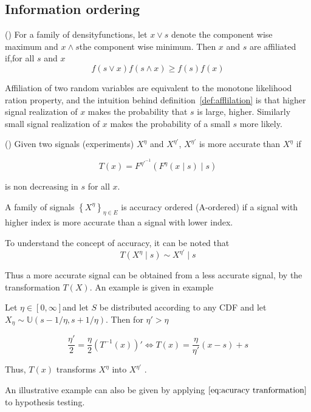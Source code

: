 \documentclass[10pt,a4paper]{article} %
\begin{document}

\subsection{Information ordering}

\begin{defn}
\label{def:afflilation} (\citet{Milgrom1982}) 
For a family of densityfunctions, let $x\lor s$ denote the component wise maximum and $x\land s$the component wise minimum. Then $x$ and $s$ are affiliated if,for all $s$ and $x$
\[
f(s\lor x)f(s\land x)\ge f(s)f(x)
\]
\end{defn}

Affiliation of two random variables are equivalent to the monotone likelihood ration property, and the intuition behind definition~\ref{def:afflilation} is that higher signal realization of $x$ makes the probability that $s$ is large, higher. Similarly small signal realization of $x$ makes the probability of a small $s$ more likely.

\begin{defn}\label{def:accuracy}
(\citet{Persico2000}) Given two signals
(experiments) $X^{\eta}$ and $X^{\eta'}$, $X^{\eta'}$ is more accurate than $X^{\eta}$ if

\begin{equation}
T(x)=F^{\eta'^{-1}}(F^{\eta}(x\mid s)\mid s)\label{eq:acuracy tranformation}
\end{equation}

is non decreasing in $s$ for all $x$.

A family of signals $\left\{ X^{\eta}\right\} _{\eta\in E}$ is accuracy ordered (A-ordered) if a signal with higher index is more accurate than a signal with lower index.
\end{defn}

To understand the concept of accuracy, it can be noted that
\[
T(X^{\eta}\mid s)\sim X^{\eta'}\mid s
\]

Thus a more accurate signal can be obtained from a less accurate signal, by the transformation $T(X)$. An example is given in example

\begin{example}
Let  $\eta\in[0,\infty]$and let $S$ be distributed according to any CDF and let $X_{\eta}\sim\mathbb{U}(s-1/\eta,s+1/\eta)$. Then for $\eta'>\eta$

\[
\frac{\eta'}{2}=\frac{\eta}{2}\left(T^{-1}(x)\right)'\Leftrightarrow T(x)=\frac{\eta}{\eta'}(x-s)+s
\]

Thus, $T(x)$ transforms $X^{\eta}$ into $X^{\eta'}$ \citep{Persico1996}.
\end{example}
An illustrative example can also be given by applying $\eqref{eq:acuracy tranformation}$ to hypothesis testing.
\end{document}
